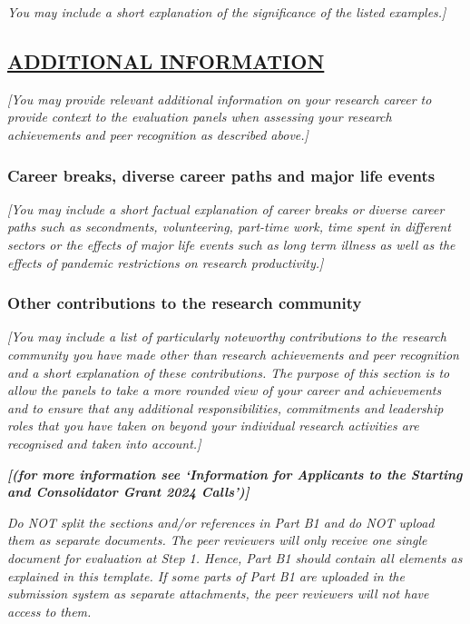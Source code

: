 \documentclass{article}
\begin{document}
\textit{You may include a short explanation of the significance of the listed examples.]}

\subsection*{\underline{ADDITIONAL INFORMATION}}

\textit{[You may provide relevant additional information on your research career to provide context to the evaluation panels when assessing your research achievements and peer recognition as described above.]}

\subsubsection*{Career breaks, diverse career paths and major life events}

\textit{[You may include a short factual explanation of career breaks or diverse career paths such as secondments, volunteering, part-time work, time spent in different sectors or the effects of major life events such as long term illness as well as the effects of pandemic restrictions on research productivity.]}

\subsubsection*{Other contributions to the research community}

\textit{[You may include a list of particularly noteworthy contributions to the research community you have made other than research achievements and peer recognition and a short explanation of these contributions. The purpose of this section is to allow the panels to take a more rounded view of your career and achievements and to ensure that any additional responsibilities, commitments and leadership roles that you have taken on beyond your individual research activities are recognised and taken into account.]}

\textit{\textbf{[(for more information see ‘Information for Applicants to the Starting and Consolidator Grant 2024 Calls’)]}}

\textit{\color{red} Do NOT split the sections and/or references in Part B1 and do NOT upload them as separate documents. The peer reviewers will only receive one single document for evaluation at Step 1. Hence, Part B1 should contain all elements as explained in this template. If some parts of Part B1 are uploaded in the submission system as separate attachments, the peer reviewers will not have access to them.}
\end{document}
